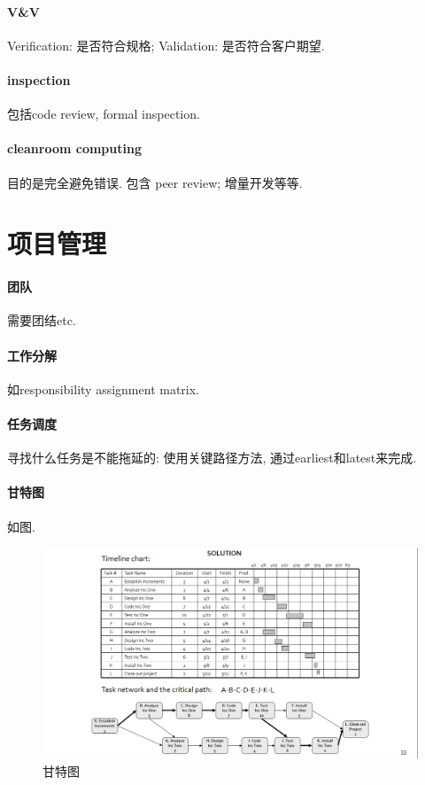\documentclass{ctexart}
\begin{document}
\paragraph{V&V} Verification: 是否符合规格; Validation: 是否符合客户期望.
\paragraph{inspection}
    包括code review, formal inspection.
\paragraph{cleanroom computing}
    目的是完全避免错误.
    包含 peer review; 增量开发等等.\par

\section{项目管理}
\paragraph{团队} 需要团结etc.
\paragraph{工作分解} 如responsibility assignment matrix.
\paragraph{任务调度} 寻找什么任务是不能拖延的:
    使用关键路径方法, 通过earliest和latest来完成.
\paragraph{甘特图} 如图.
    \begin{figure}[ht!]
        \centering
        \includegraphics[width=\textwidth, height=\textheight, keepaspectratio]{gantt.png}
        \caption{甘特图}
    \end{figure}
\end{document}
